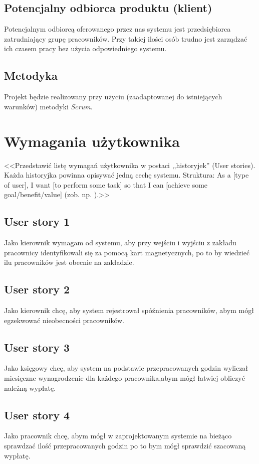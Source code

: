 \documentclass[a4paper]{article}
\begin{document}
\subsection{Potencjalny odbiorca produktu (klient)}

Potencjalnym odbiorcą oferowanego przez nas systemu jest przedsiębiorca zatrudniający grupę pracowników. Przy takiej ilości osób trudno jest zarządzać ich czasem pracy bez użycia odpowiedniego systemu.  

\subsection{Metodyka}

Projekt będzie realizowany przy użyciu (zaadaptowanej do istniejących warunków) metodyki {\em Scrum}. 

\section{Wymagania użytkownika}
<<Przedstawić listę wymagań użytkownika w postaci ,,historyjek'' (User stories). Każda historyjka powinna opisywać jedną cechę systemu. Struktura: As a [type of user], I want [to perform some task] so that I can [achieve some goal/benefit/value] (zob. np. \cite{us}).>>

\subsection{User story 1}
Jako kierownik wymagam od systemu, aby przy wejściu i wyjściu z zakładu pracownicy identyfikowali się za pomocą kart magnetycznych, po to by wiedzieć ilu pracowników jest obecnie na zakładzie.
  
\subsection{User story 2}
Jako kierownik chcę, aby system rejestrował spóźnienia pracowników, abym mógł egzekwować nieobecności pracowników.

\subsection{User story 3}
Jako księgowy chcę, aby system na podstawie przepracowanych godzin wyliczał miesięczne wynagrodzenie dla każdego pracownika,abym mógł łatwiej obliczyć należną wypłatę.

\subsection{User story 4}
Jako pracownik chcę, abym mógł w zaprojektowanym systemie na bieżąco sprawdzać ilość przepracowanych godzin po to bym mógł sprawdzić szacowaną wypłatę.
\end{document}
